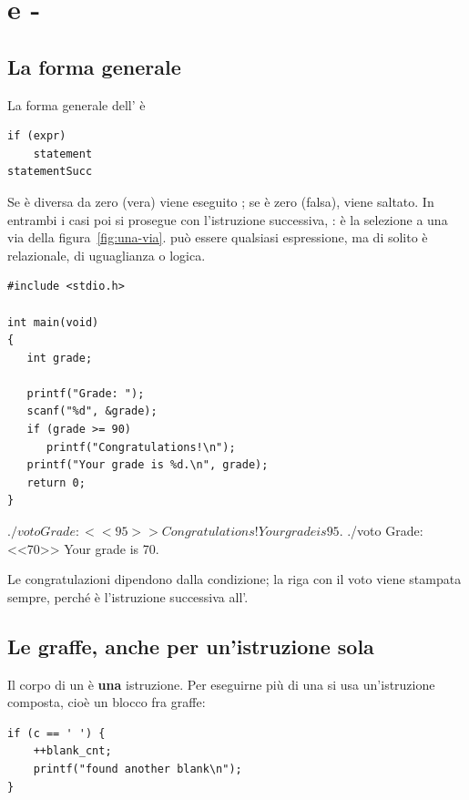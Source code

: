 \section{ e -}

\subsection{La forma generale}

La forma generale dell' è

\begin{lstlisting}[style=c]
if (expr)
    statement
statementSucc
\end{lstlisting}

Se  è diversa da zero (vera) viene eseguito ; se
è zero (falsa),  viene saltato. In entrambi i casi poi si
prosegue con l'istruzione successiva, : è la selezione a
una via della figura~\ref{fig:una-via}.  può essere qualsiasi
espressione, ma di solito è relazionale, di uguaglianza o logica.

\begin{affianco}[0.5][c]
\begin{lstlisting}[style=c, name=voto.c]
#include <stdio.h>

int main(void)
{
   int grade;

   printf("Grade: ");
   scanf("%d", &grade);
   if (grade >= 90)
      printf("Congratulations!\n");
   printf("Your grade is %d.\n", grade);
   return 0;
}
\end{lstlisting}
\risultato
\begin{console}
$ ./voto
Grade: <<95>>
Congratulations!
Your grade is 95.
$ ./voto
Grade: <<70>>
Your grade is 70.
\end{console}
\end{affianco}

Le congratulazioni dipendono dalla condizione; la riga con il voto viene
stampata sempre, perché è l'istruzione successiva all'.

\subsection{Le graffe, anche per un'istruzione sola}

Il corpo di un  è \textbf{una} istruzione. Per eseguirne più di
una si usa un'istruzione composta, cioè un blocco fra graffe:

\begin{lstlisting}[style=c]
if (c == ' ') {
    ++blank_cnt;
    printf("found another blank\n");
}
\end{lstlisting}

